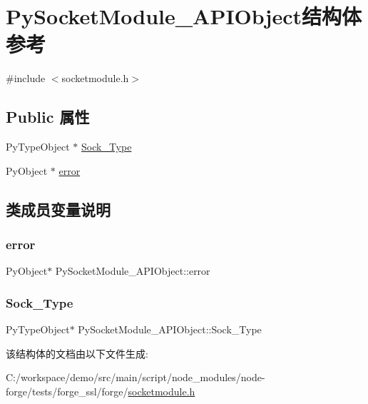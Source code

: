 \hypertarget{struct_py_socket_module___a_p_i_object}{}\section{Py\+Socket\+Module\+\_\+\+A\+P\+I\+Object结构体 参考}
\label{struct_py_socket_module___a_p_i_object}


{\ttfamily \#include $<$socketmodule.\+h$>$}

\subsection*{Public 属性}
\begin{DoxyCompactItemize}
\item 
Py\+Type\+Object $\ast$ \mbox{\hyperlink{struct_py_socket_module___a_p_i_object_a65e2a09c10379bc57d1ecb9c7c48b9fc}{Sock\+\_\+\+Type}}
\item 
Py\+Object $\ast$ \mbox{\hyperlink{struct_py_socket_module___a_p_i_object_a793ee7ef8aba79574c5ce6a3315da567}{error}}
\end{DoxyCompactItemize}


\subsection{类成员变量说明}
\mbox{\label{struct_py_socket_module___a_p_i_object_a793ee7ef8aba79574c5ce6a3315da567}} 
\subsubsection{\texorpdfstring{error}{error}}
{\footnotesize\ttfamily Py\+Object$\ast$ Py\+Socket\+Module\+\_\+\+A\+P\+I\+Object\+::error}

\mbox{\label{struct_py_socket_module___a_p_i_object_a65e2a09c10379bc57d1ecb9c7c48b9fc}} 
\subsubsection{\texorpdfstring{Sock\+\_\+\+Type}{Sock\_Type}}
{\footnotesize\ttfamily Py\+Type\+Object$\ast$ Py\+Socket\+Module\+\_\+\+A\+P\+I\+Object\+::\+Sock\+\_\+\+Type}



该结构体的文档由以下文件生成\+:\begin{DoxyCompactItemize}
\item 
C\+:/workspace/demo/src/main/script/node\+\_\+modules/node-\/forge/tests/forge\+\_\+ssl/forge/\mbox{\hyperlink{socketmodule_8h}{socketmodule.\+h}}\end{DoxyCompactItemize}
